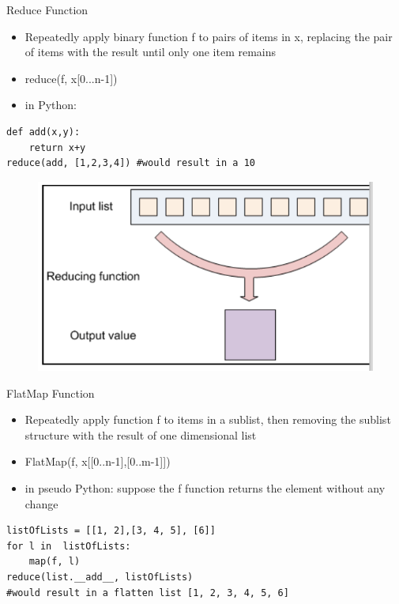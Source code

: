 \documentclass{beamer}
\begin{document}
\begin{frame}[fragile]{Reduce Function}
\begin{itemize}
\item Repeatedly apply binary function f to pairs of items in x, replacing the pair of items with the result until only one item remains
\item reduce(f, x[0...n-1])
\item in Python: \\
\end{itemize}
\begin{lstlisting}
def add(x,y): 
	return x+y 
reduce(add, [1,2,3,4]) #would result in a 10
\end{lstlisting}
\begin{figure}
		\includegraphics[scale=0.23]{img/reduce}
\end{figure}
\end{frame}

\begin{frame}[fragile]{FlatMap Function}
\begin{itemize}
\item Repeatedly apply function f to items in a sublist, then removing the sublist structure with the result of one dimensional list
\item FlatMap(f, x[[0..n-1],[0..m-1]])
\item in pseudo Python: suppose the f function returns the element without any change\\
\end{itemize}
\begin{lstlisting}
listOfLists = [[1, 2],[3, 4, 5], [6]]
for l in  listOfLists:
	map(f, l)
reduce(list.__add__, listOfLists)
#would result in a flatten list [1, 2, 3, 4, 5, 6]
\end{lstlisting}
\end{frame}
\end{document}
